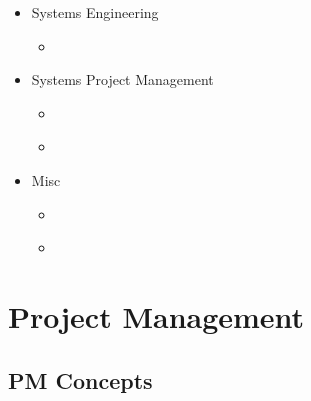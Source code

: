 \documentclass[letterpaper,10pt,english]{jupyterBook}
\begin{document}
\begin{itemize}
\item {} 
\sphinxAtStartPar
Systems Engineering

\begin{itemize}
\item {} 
\sphinxAtStartPar
{\hyperref[\detokenize{SE/sebok::doc}]{}}

\end{itemize}
\end{itemize}
\begin{itemize}
\item {} 
\sphinxAtStartPar
Systems Project Management

\begin{itemize}
\item {} 
\sphinxAtStartPar
{\hyperref[\detokenize{SPM/spm-concepts::doc}]{}}

\item {} 
\sphinxAtStartPar
{\hyperref[\detokenize{SPM/DSM::doc}]{}}

\end{itemize}
\end{itemize}
\begin{itemize}
\item {} 
\sphinxAtStartPar
Misc

\begin{itemize}
\item {} 
\sphinxAtStartPar
{\hyperref[\detokenize{Misc/pert-mod::doc}]{}}

\item {} 
\sphinxAtStartPar
{\hyperref[\detokenize{Misc/putnam::doc}]{}}

\end{itemize}
\end{itemize}

\sphinxstepscope


\part{Project Management}

\sphinxstepscope


\chapter{PM Concepts}
\label{\detokenize{PM/pm-concepts:pm-concepts}}\label{\detokenize{PM/pm-concepts::doc}}
\end{document}
